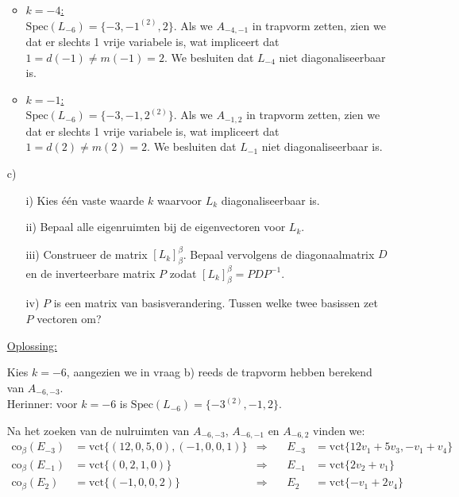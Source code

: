 \documentclass[kulak]{kulakarticle} %
\begin{document}
\begin{itemize}
\begin{itemize}
		\item \underline{\(k = -4\):}\\
		\(\text{Spec}(L_{-6})=\{-3,-1^{(2)},2\}\). Als we \(A_{-4,-1}\) in trapvorm zetten, zien we dat er slechts 1 vrije variabele is, wat impliceert dat \(1=d(-1)\neq m(-1)=2\). We besluiten dat \(L_{-4}\) niet diagonaliseerbaar is.

		\item \underline{\(k = -1\):}\\
		\(\text{Spec}(L_{-6})=\{-3,-1,2^{(2)}\}\). Als we \(A_{-1,2}\) in trapvorm zetten, zien we dat er slechts 1 vrije variabele is, wat impliceert dat \(1=d(2)\neq m(2)=2\). We besluiten dat \(L_{-1}\) niet diagonaliseerbaar is.
	\end{itemize}

	\item[c)] \begin{itemize}
		\item[i)] Kies één vaste waarde \(k\) waarvoor \(L_k\) diagonaliseerbaar is.
		\item[ii)] Bepaal alle eigenruimten bij de eigenvectoren voor \(L_k\).
		\item[iii)] Construeer de matrix \([L_k]_{\beta}^{\beta}\). Bepaal vervolgens de diagonaalmatrix \(D\) en de inverteerbare matrix \(P\) zodat \([L_k]_{\beta}^{\beta}=PDP^{-1}\).
		\item[iv)] \(P\) is een matrix van basisverandering. Tussen welke twee basissen zet \(P\) vectoren om?
	\end{itemize}
	\vspace{0.1cm}
	\underline{Oplossing:}

	Kies \(k=-6\), aangezien we in vraag b) reeds de trapvorm hebben berekend van \(A_{-6,-3}\). \\
	Herinner: voor \(k=-6\) is \(\text{Spec}(L_{-6})=\{-3^{(2)},-1,2\}\).

	Na het zoeken van de nulruimten van \(A_{-6,-3}\), \(A_{-6,-1}\) en \(A_{-6,2}\) vinden we:
	\begin{align*}
		\text{co}_{\beta}(E_{-3}) &= \text{vct}\{(12,0,5,0),(-1,0,0,1)\} & \Rightarrow& \, &E_{-3} &= \text{vct}\{12v_1+5v_3,-v_1+v_4\}&\\
		\text{co}_{\beta}(E_{-1}) &= \text{vct}\{(0,2,1,0)\} & \Rightarrow& \, &E_{-1} &= \text{vct}\{2v_2+v_1\}&\\
		\text{co}_{\beta}(E_{2}) &= \text{vct}\{(-1,0,0,2)\} & \Rightarrow& \, &E_{2} &= \text{vct}\{-v_1+2v_4\}&
	\end{align*}


\end{itemize}
\end{document}
